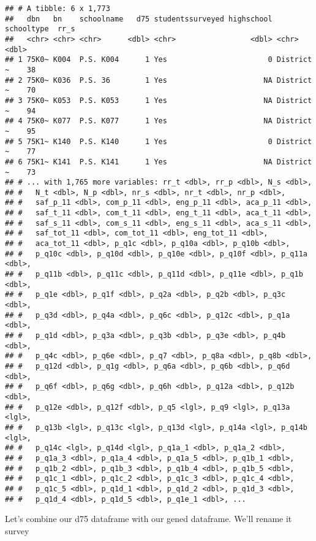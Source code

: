 \documentclass[]{article}
\newenvironment{Shaded}{\begin{snugshade}}{\end{snugshade}}
\newcommand{\KeywordTok}[1]{\textcolor[rgb]{0.13,0.29,0.53}{\textbf{#1}}}
\newcommand{\NormalTok}[1]{#1}
\newcommand{\OperatorTok}[1]{\textcolor[rgb]{0.81,0.36,0.00}{\textbf{#1}}}
\newcommand{\StringTok}[1]{\textcolor[rgb]{0.31,0.60,0.02}{#1}}
\begin{document}
\begin{verbatim}
## # A tibble: 6 x 1,773
##   dbn   bn    schoolname   d75 studentssurveyed highschool schooltype  rr_s
##   <chr> <chr> <chr>      <dbl> <chr>                 <dbl> <chr>      <dbl>
## 1 75K0~ K004  P.S. K004      1 Yes                       0 District ~    38
## 2 75K0~ K036  P.S. 36        1 Yes                      NA District ~    70
## 3 75K0~ K053  P.S. K053      1 Yes                      NA District ~    94
## 4 75K0~ K077  P.S. K077      1 Yes                      NA District ~    95
## 5 75K1~ K140  P.S. K140      1 Yes                       0 District ~    77
## 6 75K1~ K141  P.S. K141      1 Yes                      NA District ~    73
## # ... with 1,765 more variables: rr_t <dbl>, rr_p <dbl>, N_s <dbl>,
## #   N_t <dbl>, N_p <dbl>, nr_s <dbl>, nr_t <dbl>, nr_p <dbl>,
## #   saf_p_11 <dbl>, com_p_11 <dbl>, eng_p_11 <dbl>, aca_p_11 <dbl>,
## #   saf_t_11 <dbl>, com_t_11 <dbl>, eng_t_11 <dbl>, aca_t_11 <dbl>,
## #   saf_s_11 <dbl>, com_s_11 <dbl>, eng_s_11 <dbl>, aca_s_11 <dbl>,
## #   saf_tot_11 <dbl>, com_tot_11 <dbl>, eng_tot_11 <dbl>,
## #   aca_tot_11 <dbl>, p_q1c <dbl>, p_q10a <dbl>, p_q10b <dbl>,
## #   p_q10c <dbl>, p_q10d <dbl>, p_q10e <dbl>, p_q10f <dbl>, p_q11a <dbl>,
## #   p_q11b <dbl>, p_q11c <dbl>, p_q11d <dbl>, p_q11e <dbl>, p_q1b <dbl>,
## #   p_q1e <dbl>, p_q1f <dbl>, p_q2a <dbl>, p_q2b <dbl>, p_q3c <dbl>,
## #   p_q3d <dbl>, p_q4a <dbl>, p_q6c <dbl>, p_q12c <dbl>, p_q1a <dbl>,
## #   p_q1d <dbl>, p_q3a <dbl>, p_q3b <dbl>, p_q3e <dbl>, p_q4b <dbl>,
## #   p_q4c <dbl>, p_q6e <dbl>, p_q7 <dbl>, p_q8a <dbl>, p_q8b <dbl>,
## #   p_q12d <dbl>, p_q1g <dbl>, p_q6a <dbl>, p_q6b <dbl>, p_q6d <dbl>,
## #   p_q6f <dbl>, p_q6g <dbl>, p_q6h <dbl>, p_q12a <dbl>, p_q12b <dbl>,
## #   p_q12e <dbl>, p_q12f <dbl>, p_q5 <lgl>, p_q9 <lgl>, p_q13a <lgl>,
## #   p_q13b <lgl>, p_q13c <lgl>, p_q13d <lgl>, p_q14a <lgl>, p_q14b <lgl>,
## #   p_q14c <lgl>, p_q14d <lgl>, p_q1a_1 <dbl>, p_q1a_2 <dbl>,
## #   p_q1a_3 <dbl>, p_q1a_4 <dbl>, p_q1a_5 <dbl>, p_q1b_1 <dbl>,
## #   p_q1b_2 <dbl>, p_q1b_3 <dbl>, p_q1b_4 <dbl>, p_q1b_5 <dbl>,
## #   p_q1c_1 <dbl>, p_q1c_2 <dbl>, p_q1c_3 <dbl>, p_q1c_4 <dbl>,
## #   p_q1c_5 <dbl>, p_q1d_1 <dbl>, p_q1d_2 <dbl>, p_q1d_3 <dbl>,
## #   p_q1d_4 <dbl>, p_q1d_5 <dbl>, p_q1e_1 <dbl>, ...
\end{verbatim}

Let's combine our d75 dataframe with our gened dataframe. We'll rename
it survey

\begin{Shaded}
\end{Shaded}
\end{document}
